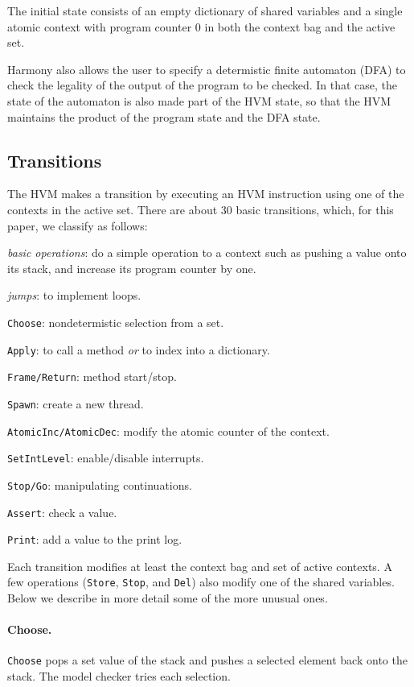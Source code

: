 \documentclass[twocolumn]{article}
\begin{document}
The initial state consists of an empty dictionary of shared variables and
a single atomic context with program
counter 0 in both the context bag and the active set.

Harmony also allows the user to specify a determistic finite automaton
(DFA) to check the legality of the output of the program to be
checked.  In that case, the state of the automaton is also made
part of the HVM state, so that the HVM maintains the product of the
program state and the DFA state.

\subsection{Transitions}

The HVM makes a transition by executing an HVM instruction using
one of the contexts in the active set.  There are about 30 basic
transitions, which, for this paper, we classify as follows:

\begin{compactitem}
\item \emph{basic operations}: do a simple operation to a context
such as pushing a value onto its stack, and increase its program
counter by one.
\item \emph{jumps}: to implement loops.
\item \texttt{Choose}: nondetermistic selection from a set.
\item \texttt{Apply}: to call a method \emph{or} to index into a dictionary.
\item \texttt{Frame/Return}: method start/stop.
\item \texttt{Spawn}: create a new thread.
\item \texttt{AtomicInc/AtomicDec}: modify the atomic counter of the context.
\item \texttt{SetIntLevel}: enable/disable interrupts.
\item \texttt{Stop/Go}: manipulating continuations.
\item \texttt{Assert}: check a value.
\item \texttt{Print}: add a value to the print log.
\end{compactitem}

Each transition modifies at least the context bag and set of active
contexts.
A few operations (\texttt{Store}, \texttt{Stop}, and \texttt{Del})
also modify one of the shared variables.
Below we describe in more detail some of the more unusual ones.

\paragraph{Choose.} \texttt{Choose} pops a set value of the stack
and pushes a selected element back onto the stack.  The model checker
tries each selection.
\end{document}
